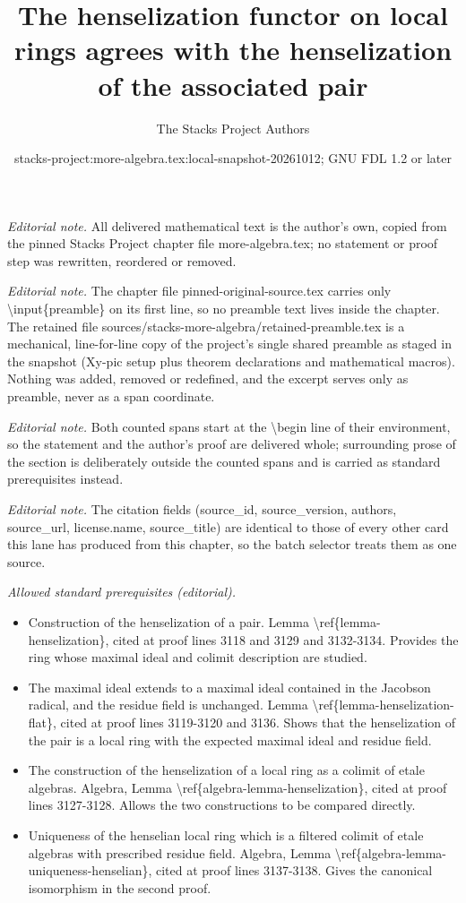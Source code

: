\documentclass[10pt,a4paper]{amsart}
\title{The henselization functor on local rings agrees with the henselization of the associated pair}
\author{The Stacks Project Authors}
\date{stacks-project:more-algebra.tex:local-snapshot-20261012; GNU FDL 1.2 or later}
\theoremstyle{plain}
\theoremstyle{definition}
\theoremstyle{remark}
\numberwithin{equation}{subsection}
\begin{document}
\maketitle
\setcounter{subsection}{1}
\noindent\textit{Editorial note.} All delivered mathematical text is the author's own, copied from the pinned Stacks Project chapter file more-algebra.tex; no statement or proof step was rewritten, reordered or removed.\par\medskip
\noindent\textit{Editorial note.} The chapter file pinned-original-source.tex carries only \textbackslash{}input\{preamble\} on its first line, so no preamble text lives inside the chapter. The retained file sources/stacks-more-algebra/retained-preamble.tex is a mechanical, line-for-line copy of the project's single shared preamble as staged in the snapshot (Xy-pic setup plus theorem declarations and mathematical macros). Nothing was added, removed or redefined, and the excerpt serves only as preamble, never as a span coordinate.\par\medskip
\noindent\textit{Editorial note.} Both counted spans start at the \textbackslash{}begin line of their environment, so the statement and the author's proof are delivered whole; surrounding prose of the section is deliberately outside the counted spans and is carried as standard prerequisites instead.\par\medskip
\noindent\textit{Editorial note.} The citation fields (source\_id, source\_version, authors, source\_url, license.name, source\_title) are identical to those of every other card this lane has produced from this chapter, so the batch selector treats them as one source.\par\medskip
\noindent\textit{Allowed standard prerequisites (editorial).}\begin{itemize}
\item Construction of the henselization of a pair. Lemma \textbackslash{}ref\{lemma-henselization\}, cited at proof lines 3118 and 3129 and 3132-3134. Provides the ring whose maximal ideal and colimit description are studied.
\item The maximal ideal extends to a maximal ideal contained in the Jacobson radical, and the residue field is unchanged. Lemma \textbackslash{}ref\{lemma-henselization-flat\}, cited at proof lines 3119-3120 and 3136. Shows that the henselization of the pair is a local ring with the expected maximal ideal and residue field.
\item The construction of the henselization of a local ring as a colimit of etale algebras. Algebra, Lemma \textbackslash{}ref\{algebra-lemma-henselization\}, cited at proof lines 3127-3128. Allows the two constructions to be compared directly.
\item Uniqueness of the henselian local ring which is a filtered colimit of etale algebras with prescribed residue field. Algebra, Lemma \textbackslash{}ref\{algebra-lemma-uniqueness-henselian\}, cited at proof lines 3137-3138. Gives the canonical isomorphism in the second proof.
\end{itemize}\medskip
\end{document}
